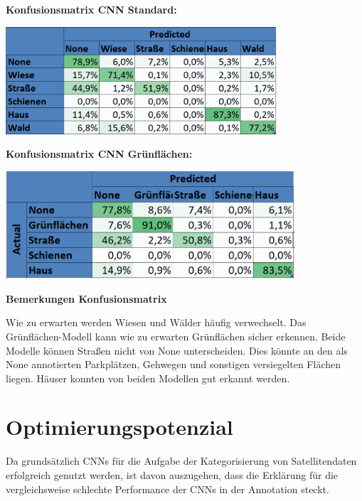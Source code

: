 \smallskip

\textbf{Konfusionsmatrix CNN Standard:}\\

\begin{center}
\includegraphics[height=4cm]{../../data/models/Konfusionsmatrix_CNN_Standard}
\end{center}

\smallskip

\textbf{Konfusionsmatrix CNN Grünflächen:}\\

\begin{center}
\includegraphics[height=4cm]{../../data/models/Konfusionsmatrix_CNN_Gruenflaechen}
\end{center}

\textbf{Bemerkungen Konfusionsmatrix}

Wie zu erwarten werden Wiesen und Wälder häufig verwechselt.
Das Grünflächen-Modell kann wie zu erwarten Grünflächen sicher erkennen.
Beide Modelle können Straßen nicht von None unterscheiden.
Dies könnte an den als None annotierten Parkplätzen, Gehwegen und sonstigen versiegelten Flächen liegen.
Häuser konnten von beiden Modellen gut erkannt werden.


\section{Optimierungspotenzial}
Da grundsätzlich CNNs für die Aufgabe der Kategorisierung von Satellitendaten erfolgreich genutzt werden,
ist davon auszugehen, dass die Erklärung für die vergleichsweise schlechte Performance der CNNs in der Annotation steckt.

